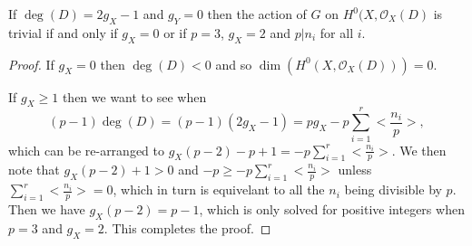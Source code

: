 \begin{lem}
If $\deg(D)=2g_X-1$ and $g_Y=0$ then the action of $G$ on $H^0(X,\mathscr{O}_X(D)$ is trivial if and only if $g_X=0$ or if $p=3$, $g_X=2$ and $p|n_i$ for all $i$.
\end{lem}
\begin{proof}
If $g_X=0$ then $\deg(D)<0$ and so $\dim(H^0(X,\mathscr{O}_X(D)))=0$.

If $g_X\geq1$ then we want to see when 
	\[
		(p-1)\deg(D)=(p-1)(2g_X-1)=pg_X-p\sum_{i=1}^r\Big<\frac{n_i}{p}\Big>,
	\]
which can be re-arranged to $g_X(p-2)-p+1=-p\sum_{i=1}^r\Big<\frac{n_i}{p}\Big>$. We then note that $g_X(p-2)+1>0$ and $-p\geq -p\sum_{i=1}^r\Big<\frac{n_i}{p}\Big>$ unless $\sum_{i=1}^r\Big<\frac{n_i}{p}\Big>=0$, which in turn is equivelant to all the $n_i$ being divisible by $p$. Then we have $g_X(p-2)=p-1$, which is only solved for positive integers when $p=3$ and $g_X=2$. This completes the proof.
\end{proof}